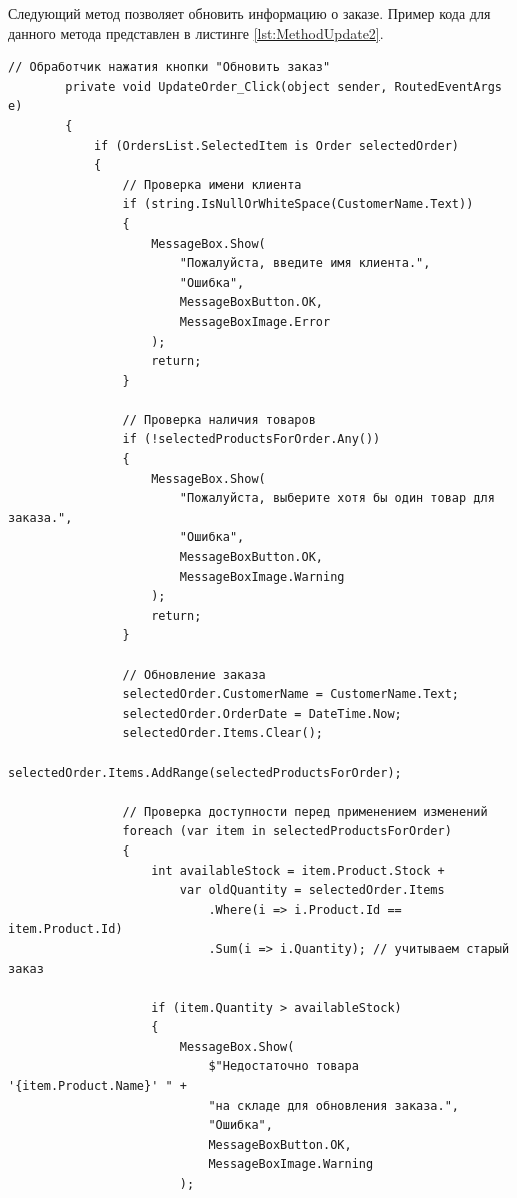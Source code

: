 \documentclass[12pt]{article}
\newcommand{\colorGIT}[1]{\textcolor{CtpGreen}{#1}}
\begin{document}
\newpage

Следующий метод позволяет обновить информацию о заказе. Пример кода для данного метода представлен в листинге \ref{lst:MethodUpdate2}.


\begin{lstlisting}[style=csharp_catppuccin, caption=\colorGIT{\href{https://github.com/WebMasterIT/Csharp_Labs/blob/ec375afd16c0647b337cf3d8a79c8bef904fc1be/3lab/StoreManager/MainWindow.xaml.cs\#L218-L266}{Метод}} обновления заказа, label=lst:MethodUpdate2]
        // Обработчик нажатия кнопки "Обновить заказ"
        private void UpdateOrder_Click(object sender, RoutedEventArgs e)
        {
            if (OrdersList.SelectedItem is Order selectedOrder)
            {
                // Проверка имени клиента
                if (string.IsNullOrWhiteSpace(CustomerName.Text))
                {
                    MessageBox.Show(
                        "Пожалуйста, введите имя клиента.", 
                        "Ошибка", 
                        MessageBoxButton.OK, 
                        MessageBoxImage.Error
                    );
                    return;
                }

                // Проверка наличия товаров
                if (!selectedProductsForOrder.Any())
                {
                    MessageBox.Show(
                        "Пожалуйста, выберите хотя бы один товар для заказа.", 
                        "Ошибка", 
                        MessageBoxButton.OK, 
                        MessageBoxImage.Warning
                    );
                    return;
                }

                // Обновление заказа
                selectedOrder.CustomerName = CustomerName.Text;
                selectedOrder.OrderDate = DateTime.Now;
                selectedOrder.Items.Clear();
                selectedOrder.Items.AddRange(selectedProductsForOrder); 

                // Проверка доступности перед применением изменений
                foreach (var item in selectedProductsForOrder)
                {
                    int availableStock = item.Product.Stock +
                        var oldQuantity = selectedOrder.Items
                            .Where(i => i.Product.Id == item.Product.Id)
                            .Sum(i => i.Quantity); // учитываем старый заказ

                    if (item.Quantity > availableStock)
                    {
                        MessageBox.Show(
                            $"Недостаточно товара '{item.Product.Name}' " +
                            "на складе для обновления заказа.", 
                            "Ошибка", 
                            MessageBoxButton.OK, 
                            MessageBoxImage.Warning
                        );


\end{lstlisting}
\end{document}
